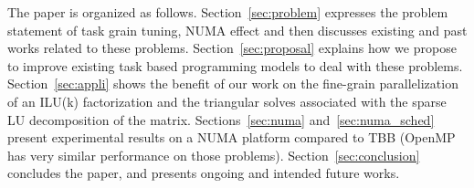 





The paper is organized as follows. Section~\ref{sec:problem} expresses the
problem statement of task grain tuning, NUMA effect and then discusses
existing and past works related to these problems.
Section~\ref{sec:proposal} explains how we propose to improve existing task
based programming models to deal with these problems.
Section~\ref{sec:appli} shows the benefit of our work on the fine-grain
parallelization of an ILU(k) factorization and the triangular solves
associated with the sparse LU decomposition of the matrix.
Sections~\ref{sec:numa} and~\ref{sec:numa_sched} present experimental results
on a NUMA platform compared to TBB (OpenMP has very similar performance on those problems).
Section~\ref{sec:conclusion} concludes the paper, and presents ongoing
and intended future works.
